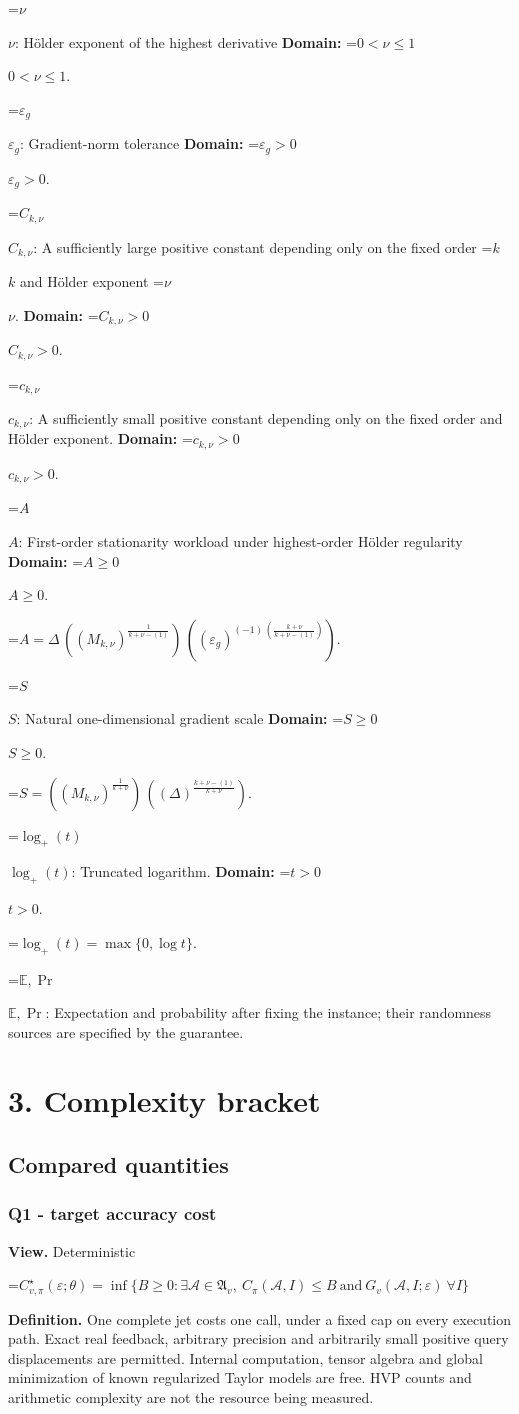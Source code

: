 \documentclass[10pt,a4paper]{article}
\newcommand{\AtlasMath}[1]{\par\begingroup\centering\setbox0=\hbox{$\displaystyle #1$}\ifdim\wd0>1.4\linewidth\typeout{ATLAS WIDE FORMULA: \the\wd0}\fi\ifdim\wd0>\linewidth\resizebox{\linewidth}{!}{\box0}\else\box0\fi\par\endgroup}
\newcommand{\AtlasInlineMath}[1]{\begingroup\setbox0=\hbox{$#1$}\ifdim\wd0>.4\linewidth\endgroup\AtlasMath{#1}\else\endgroup$#1$\fi}
\begin{document}
\AtlasInlineMath{\nu}: Hölder exponent of the highest derivative \textbf{Domain:} \AtlasInlineMath{0<\nu\le1}.

\AtlasInlineMath{\varepsilon_g}: Gradient-norm tolerance \textbf{Domain:} \AtlasInlineMath{\varepsilon_g>0}.

\AtlasInlineMath{C_{k,\nu}}: A sufficiently large positive constant depending only on the fixed order \AtlasInlineMath{k} and Hölder exponent \AtlasInlineMath{\nu}. \textbf{Domain:} \AtlasInlineMath{C_{k,\nu}>0}.

\AtlasInlineMath{c_{k,\nu}}: A sufficiently small positive constant depending only on the fixed order and Hölder exponent. \textbf{Domain:} \AtlasInlineMath{c_{k,\nu}>0}.

\AtlasInlineMath{A}: First-order stationarity workload under highest-order Hölder regularity \textbf{Domain:} \AtlasInlineMath{A\ge0}.


\AtlasMath{A=\Delta\,((M_{k,\nu})^{\frac{1}{k+\nu-(1)}})\,((\varepsilon_g)^{(-1)\,(\frac{k+\nu}{k+\nu-(1)})}).}


\AtlasInlineMath{S}: Natural one-dimensional gradient scale \textbf{Domain:} \AtlasInlineMath{S\ge0}.


\AtlasMath{S=((M_{k,\nu})^{\frac{1}{k+\nu}})\,((\Delta)^{\frac{k+\nu-(1)}{k+\nu}}).}


\AtlasInlineMath{\log_+(t)}: Truncated logarithm. \textbf{Domain:} \AtlasInlineMath{t>0}.


\AtlasMath{\log_+(t)=\max\{0,\log t\}.}


\AtlasInlineMath{\mathbb{E},\Pr}: Expectation and probability after fixing the instance; their randomness sources are specified by the guarantee.

\section{3. Complexity bracket}
\subsection{Compared quantities}
\subsubsection{Q1 - target accuracy cost}
\textbf{View.} Deterministic

\AtlasMath{C^\star_{v,\pi}(\varepsilon;\theta)=\inf\{B\ge0:\exists\mathcal A\in\mathfrak A_v,\ C_\pi(\mathcal A,I)\le B\ \text{and}\ G_v(\mathcal A,I;\varepsilon)\ \forall I\}}
\textbf{Definition.} One complete jet costs one call, under a fixed cap on every execution path. Exact real feedback, arbitrary precision and arbitrarily small positive query displacements are permitted. Internal computation, tensor algebra and global minimization of known regularized Taylor models are free. HVP counts and arithmetic complexity are not the resource being measured.
\end{document}
